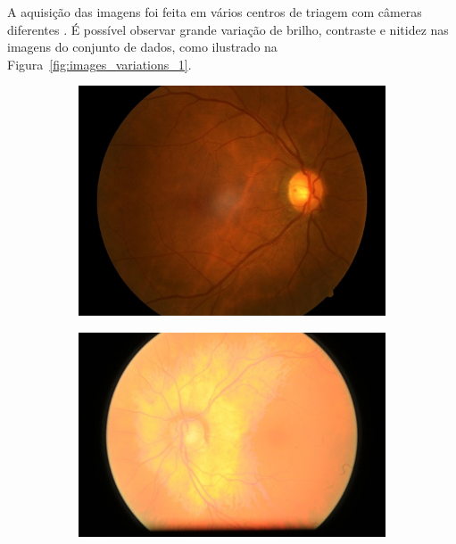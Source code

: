 \documentclass[12pt]{article}
\begin{document}
A aquisição das imagens foi feita em vários centros de triagem com câmeras diferentes \cite{justraigs_article}.
É possível observar grande variação de brilho, contraste e nitidez nas imagens do conjunto de dados, como ilustrado na Figura~\ref{fig:images_variations_1}.

\begin{figure}
    \centering
    \begin{subfigure}[b]{0.2\textwidth}
        \centering
        \includegraphics[width=\textwidth]{images/examples_from_dataset/TRAIN000282.JPG}
        \label{fig:images_variations_1_1}
    \end{subfigure}
    \hfill
    \begin{subfigure}[b]{0.2\textwidth}
        \centering
        \includegraphics[width=\textwidth]{images/examples_from_dataset/TRAIN012425.JPG}

\end{subfigure}
\end{figure}
\end{document}
